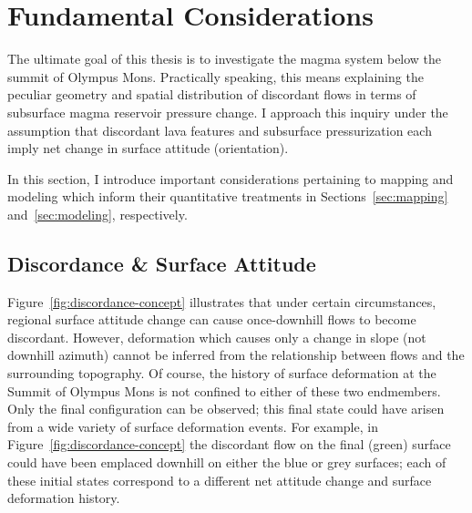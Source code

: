 \section{Fundamental Considerations}\label{sec:considerations}

The ultimate goal of this thesis is to investigate the magma system below the summit of Olympus Mons. Practically speaking, this means explaining the peculiar geometry and spatial distribution of discordant flows in terms of subsurface magma reservoir pressure change. I approach this inquiry under the assumption that discordant lava features and subsurface pressurization each imply net change in surface attitude (orientation). 

In this section, I introduce important considerations pertaining to mapping and modeling which inform their quantitative treatments in Sections~\ref{sec:mapping} and~\ref{sec:modeling}, respectively.


\subsection{Discordance \& Surface Attitude}\label{sec:downhill-flows}

Figure~\ref{fig:discordance-concept} illustrates that under certain circumstances, regional surface attitude change can cause once-downhill flows to become discordant. However, deformation which causes only a change in slope (not downhill azimuth) cannot be inferred from the relationship between flows and the surrounding topography. Of course, the history of surface deformation at the Summit of Olympus Mons is not confined to either of these two endmembers. Only the final configuration can be observed; this final state could have arisen from a wide variety of surface deformation events. For example, in Figure~\ref{fig:discordance-concept} the discordant flow on the final (green) surface could have been emplaced downhill on either the blue or grey surfaces; each of these initial states correspond to a different net attitude change and surface deformation history.


